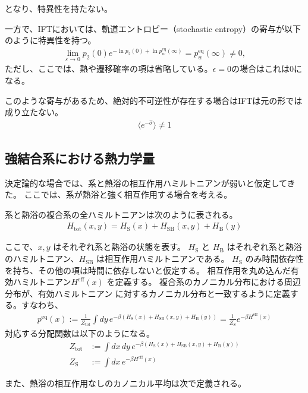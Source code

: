 \documentclass[a4paper,11pt]{jsarticle}
\numberwithin{equation}{section}
\begin{document}
となり、特異性を持たない。

一方で、IFTにおいては、軌道エントロピー（stochastic entropy）の寄与が以下のように特異性を持つ。
\begin{align}
\lim_{\varepsilon \to 0} p_2(0) e^{ -\ln p_2(0) + \ln p_w^{\mathrm{eq}}(\infty) }
= p_w^{\mathrm{eq}}(\infty) \ne 0,
\end{align}
ただし、ここでは、熱や遷移確率の項は省略している。$\epsilon =0$の場合はこれは0になる。

このような寄与があるため、絶対的不可逆性が存在する場合はIFTは元の形では成り立たない。
\begin{align}
\langle e^{-\hat{\sigma}} \rangle \neq 1
\end{align}

\subsection{強結合系における熱力学量}

決定論的な場合では、系と熱浴の相互作用ハミルトニアンが弱いと仮定してきた。  
ここでは、系が熱浴と強く相互作用する場合を考える。

系と熱浴の複合系の全ハミルトニアンは次のように表される。
\begin{align}
H_{\text{tot}}(x, y) = H_{\text{S}}(x) + H_{\text{SB}}(x, y) + H_{\text{B}}(y)
\end{align}

ここで、$x, y$ はそれぞれ系と熱浴の状態を表す。
$H_{\text{S}}$ と $H_{\text{B}}$ はそれぞれ系と熱浴のハミルトニアン、$H_{\text{SB}}$ は相互作用ハミルトニアンである。
$H_{\text{S}}$ のみ時間依存性を持ち、その他の項は時間に依存しないと仮定する。
相互作用を丸め込んだ有効ハミルトニアン$H^{\mathrm{eff}}(x)$ を定義する。
複合系のカノニカル分布における周辺分布が、有効ハミルトニアン に対するカノニカル分布と一致するように定義する。すなわち、
\begin{align}
p^{\mathrm{eq}}(x)
:= \frac{1}{Z_{\text{tot}}} \int dy\, e^{-\beta(H_{\text{S}}(x) + H_{\text{SB}}(x,y) + H_{\text{B}}(y))}
= \frac{1}{Z_{\text{S}}} e^{-\beta H^{\mathrm{eff}}(x)}
\end{align}
対応する分配関数は以下のようになる。
\begin{align}
Z_{\text{tot}} &:= \int dx\, dy\, e^{-\beta(H_{\text{S}}(x) + H_{\text{SB}}(x,y) + H_{\text{B}}(y))} \\
Z_{\text{S}} &:= \int dx\, e^{-\beta H^{\mathrm{eff}}(x)}
\end{align}

また、熱浴の相互作用なしのカノニカル平均は次で定義される。
\end{document}
